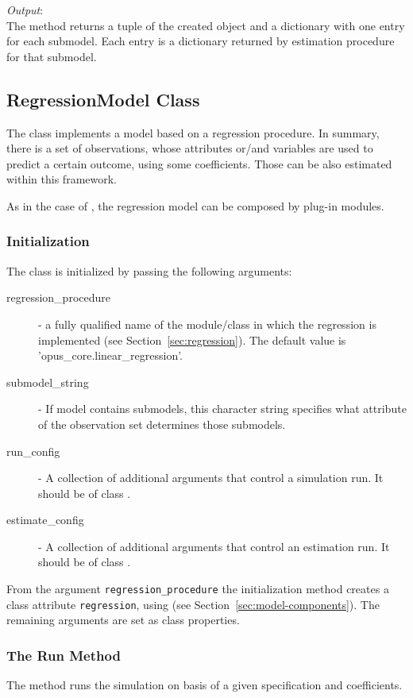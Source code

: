 {{\it Output}:~\\[1mm]
The method returns a tuple of the created  \coefficientsindex object and a
dictionary with one entry for each submodel. 
Each entry is a dictionary returned by estimation procedure for that submodel.

\subsection{RegressionModel Class}
%
\label{sec:regression-model}
The  class implements a model based on a regression
procedure. In summary, there is a set of observations, whose attributes \attributesindex or/and
variables \variablesindex are used to predict a certain outcome, using some coefficients. \coefficientsindex
Those can be also estimated within this framework.

As in the case of , the regression model can be composed by
plug-in modules.

\subsubsection{Initialization}
The class is initialized by passing the following arguments:
\begin{description}
\item[regression_procedure] - a fully qualified name of the module/class in
  which the regression is implemented (see Section~\ref{sec:regression}).
  The default value is 'opus_core.linear_regression'.
\item[submodel_string] - If model contains submodels, this character string
  specifies what attribute of the observation set determines those submodels.
\item[run_config] - A collection of additional arguments that control a
  simulation run. It should be of class .
\item[estimate_config] - A collection of additional arguments that control an
  estimation run. It should be of class .
\end{description}
From the argument \verb|regression_procedure| the initialization method
creates a class attribute \attributesindex \verb|regression|, using
 (see Section~\ref{sec:model-components}).
The remaining arguments are set as class properties.

\subsubsection{The Run Method}
%
The  method runs the simulation on basis of a given
specification and coefficients. \coefficientsindex

}
